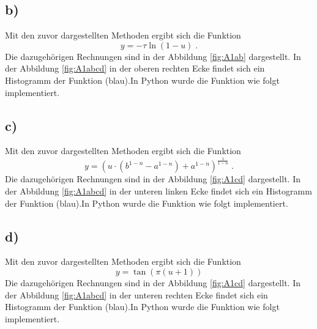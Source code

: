 \subsection{b)}
Mit den zuvor dargestellten Methoden ergibt sich die Funktion
\begin{equation}
y = - \tau \ln(1-u) \; .	
\end{equation}
Die dazugehörigen Rechnungen sind in der Abbildung \ref{fig:A1ab} dargestellt.
In der Abbildung \ref{fig:A1abcd} in der oberen rechten Ecke findet sich ein Histogramm der 
Funktion (blau).In Python wurde die Funktion wie folgt implementiert.




\subsection{c)}
Mit den zuvor dargestellten Methoden ergibt sich die Funktion
\begin{equation}
y = \left( u \cdot \left(b^{1-n} - a^{1-n} \right) + a^{1-n} \right)^{\frac{1}{1-n}} \; .
\end{equation}
Die dazugehörigen Rechnungen sind in der Abbildung \ref{fig:A1cd} dargestellt.
In der Abbildung \ref{fig:A1abcd} in der unteren linken Ecke findet sich ein Histogramm der 
Funktion (blau).In Python wurde die Funktion wie folgt implementiert.



\subsection{d)}
Mit den zuvor dargestellten Methoden ergibt sich die Funktion
\begin{equation}
y = \tan ( \pi (u +1 ))
\end{equation}
Die dazugehörigen Rechnungen sind in der Abbildung \ref{fig:A1cd} dargestellt.
In der Abbildung \ref{fig:A1abcd} in der unteren rechten Ecke findet sich ein Histogramm der 
Funktion (blau).In Python wurde die Funktion wie folgt implementiert.



